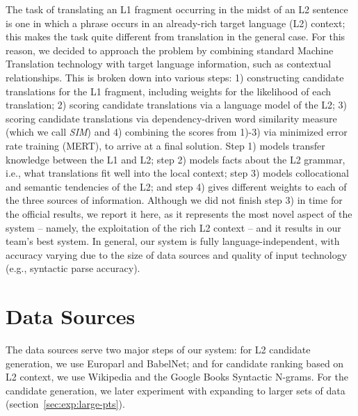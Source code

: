 \documentclass[11pt]{article}
\begin{document}
The task of translating an L1 fragment occurring in the midst of an L2 sentence is one in which a phrase occurs in an already-rich target language (L2) context; this makes the task quite different from translation in the general case. 
For this reason, we decided to approach the problem by combining standard Machine Translation technology with target language information,
such as contextual relationships. 
This is broken down into various steps: 1) constructing candidate translations for the L1 fragment, including weights for the likelihood of each translation; 2) scoring candidate translations via a language model of the L2; 3) scoring candidate translations via dependency-driven word similarity measure \cite{lin:98} (which we call \textit{SIM})
and 4) combining the scores from 1)-3) via minimized error rate training (MERT), to arrive at a final solution.  Step 1) models transfer knowledge between the L1 and L2; step 2) models facts about the L2 grammar, i.e., what translations fit well into the local context; step 3) models collocational and semantic tendencies of the L2; and step 4)  gives different weights to each of the three sources of information.  Although we did not finish step 3) in time for the official results, we report it here, as it represents the most novel aspect of the system -- namely, the exploitation of the rich L2 context -- and it results in our team's best system.  In general, our system is fully language-independent, with accuracy varying due to the size of data sources and quality of input technology (e.g., syntactic parse accuracy).

\section{Data Sources}
The data sources serve two major steps of our system: for L2 candidate generation, we use Europarl and BabelNet; and for candidate ranking based on L2 context, we use Wikipedia and the Google Books Syntactic N-grams.  For the candidate generation, we later experiment with expanding to larger sets of data (section~\ref{sec:exp:large-pts}).
\end{document}
